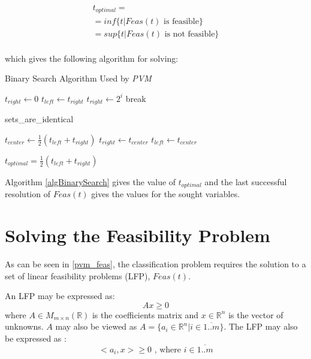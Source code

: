 \documentclass[a4paper,twoside,10pt]{report}
\begin{document}
	\[
		\begin{array}{l}
		t_{optimal} = \\
		= inf\{t | Feas(t)\mbox{ is feasible}\} \\
		= sup\{t | Feas(t)\mbox{ is not feasible}\} \\
		\end{array}
	\]
	
	which gives the following algorithm for solving:
	
	\begin{algorithm}
	\caption{Binary Search Algorithm Used by \textit{PVM}}
	\label{algBinarySearch}
	\begin{center}
	\begin{algorithmic}
	
		\STATE \(t_{right} \gets 0\)
			\STATE \(t_{left}\gets t_{right}\)
			\STATE \(t_{right}\gets 2^i\)
				\STATE break
			\ENDIF
		\ENDFOR
		
			\RETURN sets{\_}are{\_}identical
		\ENDIF
		
			\STATE \(t_{center}\gets \frac{1}{2} (t_{left} + t_{right})\)
				\STATE \(t_{right}\gets t_{center}\)				
			\ELSE
				\STATE \(t_{left}\gets t_{center}\)
			\ENDIF			
		\ENDWHILE
		
		\STATE \(t_{optimal} = \frac{1}{2} (t_{left} + t_{right})\)	
	\end{algorithmic}
	\end{center}
	\end{algorithm}
\clearpage	
	
	Algorithm \ref{algBinarySearch} gives the value of \(t_{optimal}\) and the last successful resolution of \(Feas(t)\) gives the values for the sought variables.
	
	
\section{Solving the Feasibility Problem}

	As can be seen in \ref{pvm_feas}, the classification problem requires the solution to a set of linear feasibility problems (LFP), \(Feas(t)\).
	
	An LFP may be expressed as:	
	\[
		Ax \geq 0
	\]	
	where \(A\in M_{m\times n}(\mathbb{R})\) is the coefficients matrix and \(x\in \mathbb{R} ^n\) is the vector of unknowns.	
	\(A\) may also be viewed as \(A = \{a_i \in \mathbb{R}^n | i\in\overline{1..m}\}\). The LFP may also be expressed as :	
	\[
		<a_i, x> \geq 0 \mbox{ , where } i\in\overline{1..m}
	\]
	
\end{document}
